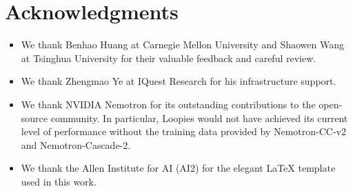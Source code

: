 \section{Acknowledgments}
\begin{itemize}
    \item We thank Benhao Huang at Carnegie Mellon University and Shaowen Wang at Tsinghua University for their valuable feedback and careful review.
    
    \item We thank Zhengmao Ye at IQuest Research for his infrastructure support.
    
    \item We thank NVIDIA Nemotron for its outstanding contributions to the open-source community. In particular, Loopies would not have achieved its current level of performance without the training data provided by Nemotron-CC-v2 and Nemotron-Cascade-2.
    
    \item We thank the Allen Institute for AI (AI2) for the elegant \LaTeX{} template used in this work.
\end{itemize}

